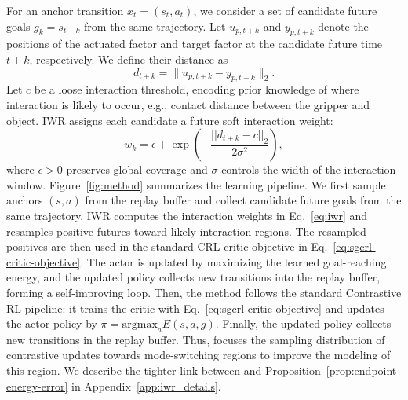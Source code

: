 For an anchor transition $x_t=(s_t,a_t)$, we consider a set of candidate future goals $g_k=s_{t+k}$ from the same trajectory. Let $u_{p,t+k}$ and $y_{p,t+k}$ denote the positions of the actuated factor and target factor at the candidate future time $t+k$, respectively. We define their distance as
\begin{equation*}
    d_{t+k}=\|u_{p,t+k}-y_{p,t+k}\|_2 .
\end{equation*}
Let $c$ be a loose interaction threshold, encoding prior knowledge of where interaction is likely to occur, e.g., contact distance between the gripper and object. IWR assigns each candidate a future soft interaction weight:
\begin{equation}
    w_k
    =
    \epsilon
    +
    \exp\left(
        -\frac{||d_{t+k}-c||_2}{2\sigma^2}
    \right),
    \label{eq:iwr}
\end{equation}
where $\epsilon>0$ preserves global coverage and $\sigma$ controls the width of the interaction window. 
Figure~\ref{fig:method} summarizes the learning pipeline. We first sample anchors \((s,a)\) from the replay buffer and collect candidate future goals from the same trajectory. IWR computes the interaction weights in Eq.~\ref{eq:iwr} and resamples positive futures toward likely interaction regions. The resampled positives are then used in the standard CRL critic objective in Eq.~\ref{eq:sgcrl-critic-objective}. The actor is updated by maximizing the learned goal-reaching energy, and the updated policy collects new transitions into the replay buffer, forming a self-improving loop. Then, the method follows the standard Contrastive RL pipeline: it trains the critic with Eq.~\ref{eq:sgcrl-critic-objective} and updates the actor policy by $\pi = \text{argmax}_a E(s,a,g)$.
Finally, the updated policy collects new transitions in the replay buffer. 
Thus, \methodshort{} focuses the sampling distribution of contrastive updates towards mode-switching regions to improve the modeling of this region. We describe the tighter link between \methodshort{} and Proposition~\ref{prop:endpoint-energy-error} in Appendix~\ref{app:iwr_details}.

